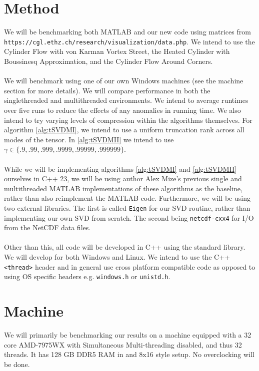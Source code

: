 \documentclass[11pt,letterpaper, onecolumn]{exam} %
\begin{document}
\section*{Method}
We will be benchmarking both MATLAB and our new code using matrices from \\ \verb|https://cgl.ethz.ch/research/visualization/data.php|.
We intend to use the Cylinder Flow with von Karman Vortex Street, the Heated Cylinder with Boussinesq Approximation, and the Cylinder Flow Around Corners.
\\\\
We will benchmark using one of our own Windows machines (see the machine section for more details). We will compare performance in both the singlethreaded and multithreaded environments. We intend to average runtimes over five runs to reduce the effects of any anomalies in running time. We also intend to try varying levels of compression within the algorithms themselves. For algorithm \ref{alg:tSVDMI}, we intend to use a uniform truncation rank across all modes of the tensor. In \ref{alg:tSVDMII} we intend to use $\gamma \in \{.9,.99,.999,.9999,.99999,.999999\}.$
\\\\
While we will be implementing algorithms \ref{alg:tSVDMI} and \ref{alg:tSVDMII} ourselves in C++ 23, we will be using author Alex Mize's previous single and multithreaded MATLAB implementations of these algorithms as the baseline, rather than also reimplement the MATLAB code. Furthermore, we will be using two external libraries. The first is called \verb|Eigen| for our SVD routine, rather than implementing our own SVD from scratch. The second being \verb|netcdf-cxx4| for I/O from the NetCDF data files.
\\\\
Other than this, all code will be developed in C++ using the standard library. We will develop for both Windows and Linux. We intend to use the C++ \verb|<thread>| header and in general use cross platform compatible code as opposed to using OS specific headers e.g. \verb|windows.h| or \verb|unistd.h|.

\section*{Machine}
We will primarily be benchmarking our results on a machine equipped with a 32 core AMD-7975WX with Simultaneous Multi-threading disabled, and thus 32 threads. It has 128 GB DDR5 RAM in and 8x16 style setup. No overclocking will be done. 
\end{document}
